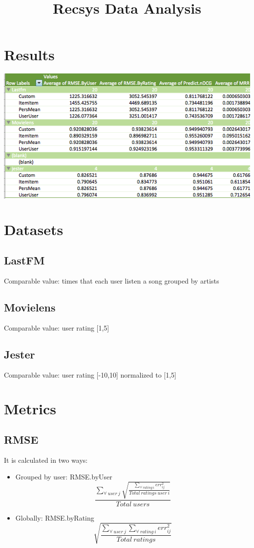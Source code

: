\documentclass[a4paper]{article}
\title{Recsys Data Analysis}
\begin{document}
\maketitle
\section{Results}

\includegraphics[scale=0.75]{Tabla.png}


\section{Datasets}
\subsection{LastFM}
Comparable value: times that each user listen a song grouped by artists
\subsection{Movielens}
Comparable value: user rating [1,5]
\subsection{Jester}
Comparable value: user rating [-10,10] normalized to [1,5]

\section{Metrics}
\subsection{RMSE}
It is calculated in two ways:
\begin{itemize}
	\item Grouped by user: RMSE.byUser
	\begin{equation}
		\frac{\displaystyle\sum_{\forall\ user\ j}\sqrt{\frac{\displaystyle\sum_{\forall\ rating\ i} err_{ij}^2}{Total\ ratings\ user\ i}}}{Total\ users}
    \end{equation}
    \item Globally: RMSE.byRating 
	\begin{equation}
		\sqrt{\frac{\displaystyle\sum_{\forall\ user\ j}\displaystyle\sum_{\forall\ rating\ i} err_{ij}^2}{Total\ ratings}}
    \end{equation}
\end {itemize}
\end{document}
